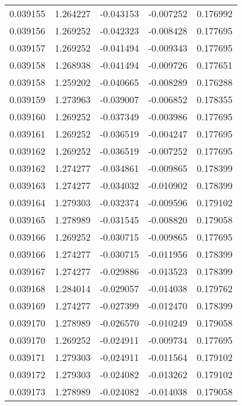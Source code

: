 \begin{tabular}{lrrrr}
0.039155    &  1.264227 & -0.043153 & -0.007252 &             0.176992 \\
0.039156    &  1.269252 & -0.042323 & -0.008428 &             0.177695 \\
0.039157    &  1.269252 & -0.041494 & -0.009343 &             0.177695 \\
0.039158    &  1.268938 & -0.041494 & -0.009726 &             0.177651 \\
0.039158    &  1.259202 & -0.040665 & -0.008289 &             0.176288 \\
0.039159    &  1.273963 & -0.039007 & -0.006852 &             0.178355 \\
0.039160    &  1.269252 & -0.037349 & -0.003986 &             0.177695 \\
0.039161    &  1.269252 & -0.036519 & -0.004247 &             0.177695 \\
0.039162    &  1.269252 & -0.036519 & -0.007252 &             0.177695 \\
0.039162    &  1.274277 & -0.034861 & -0.009865 &             0.178399 \\
0.039163    &  1.274277 & -0.034032 & -0.010902 &             0.178399 \\
0.039164    &  1.279303 & -0.032374 & -0.009596 &             0.179102 \\
0.039165    &  1.278989 & -0.031545 & -0.008820 &             0.179058 \\
0.039166    &  1.269252 & -0.030715 & -0.009865 &             0.177695 \\
0.039166    &  1.274277 & -0.030715 & -0.011956 &             0.178399 \\
0.039167    &  1.274277 & -0.029886 & -0.013523 &             0.178399 \\
0.039168    &  1.284014 & -0.029057 & -0.014038 &             0.179762 \\
0.039169    &  1.274277 & -0.027399 & -0.012470 &             0.178399 \\
0.039170    &  1.278989 & -0.026570 & -0.010249 &             0.179058 \\
0.039170    &  1.269252 & -0.024911 & -0.009734 &             0.177695 \\
0.039171    &  1.279303 & -0.024911 & -0.011564 &             0.179102 \\
0.039172    &  1.279303 & -0.024082 & -0.013262 &             0.179102 \\
0.039173    &  1.278989 & -0.024082 & -0.014038 &             0.179058 \\

\end{tabular}
